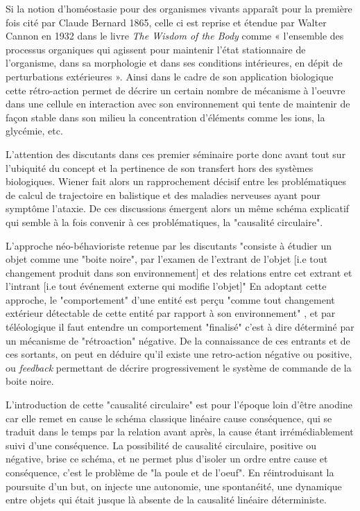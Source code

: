 {Si la notion d'homéostasie pour des organismes vivants apparaît pour la première fois cité par Claude Bernard 1865, celle ci est reprise et étendue par Walter Cannon en 1932 dans le livre \textit{The Wisdom of the Body} \autocite{Cannon1932} comme « l’ensemble des processus organiques qui agissent pour maintenir l’état stationnaire de l’organisme, dans sa morphologie et dans ses conditions intérieures, en dépit de perturbations extérieures ». Ainsi dans le cadre de son application biologique cette rétro-action permet de décrire un certain nombre de mécanisme à l'oeuvre dans une cellule en interaction avec son environnement qui tente de maintenir de façon stable dans son milieu la concentration d'éléments comme les ions, la glycémie, etc.

L'attention des discutants dans ces premier séminaire porte donc avant tout sur l'ubiquité du concept et la pertinence de son transfert hors des systèmes biologiques. Wiener fait alors un rapprochement décisif entre les problématiques de calcul de trajectoire en balistique et des maladies nerveuses ayant pour symptôme l'ataxie. De ces discussions émergent alors un même schéma explicatif qui semble à la fois convenir à ces problématiques, la "causalité circulaire". \autocite[774]{Pouvreau2013, Rosnay1975}

L'approche néo-béhavioriste retenue par les discutants "consiste à étudier un objet comme une "boite noire", par l'examen de l'extrant de l'objet [i.e tout changement produit dans son environnement] et des relations entre cet extrant et l'intrant [i.e tout événement externe qui modifie l'objet]" \autocite{Pouvreau2013} En adoptant cette approche, le "comportement" d'une entité est perçu "comme tout changement extérieur détectable de cette entité par rapport à son environnement" , et par téléologique il faut entendre un comportement "finalisé" c'est à dire déterminé par un mécanisme de "rétroaction" négative. De la connaissance de ces entrants et de ces sortants, on peut en déduire qu'il existe une retro-action négative ou positive, ou \textit{feedback} permettant de décrire progressivement le système de commande de la boite noire.

L'introduction de cette "causalité circulaire" est pour l'époque loin d'être anodine car elle remet en cause le schéma classique linéaire cause \textrightarrow conséquence, qui se traduit dans le temps par la relation avant \textrightarrow après, la cause étant irrémédiablement suivi d'une conséquence. La possibilité de causalité circulaire, positive ou négative, brise ce schéma, et ne permet plus d'isoler un ordre entre cause et conséquence, c'est le problème de "la poule et de l'oeuf". En réintroduisant la poursuite d'un but, on injecte une autonomie, une spontanéité, une dynamique entre objets qui était jusque là absente de la causalité linéaire déterministe.

}
